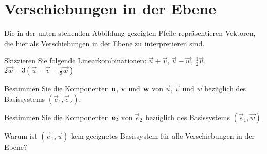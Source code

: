 \documentclass{scrartcl}
\newcommand{\uu}{\vec{u}}
\newcommand{\vv}{\vec{v}}
\newcommand{\ww}{\vec{w}}
\newcommand{\ee}{\vec{e}}
\begin{document}
\section{Verschiebungen in der Ebene }
Die in der unten stehenden Abbildung gezeigten Pfeile repräsentieren Vektoren, die hier als Verschiebungen in der Ebene zu interpretieren sind.
\begin{subex}
  \item{} Skizzieren Sie folgende Linearkombinationen: $\uu + \vv$, $\uu - \ww$, $\frac{1}{2}\uu$, $2\ww + 3(\uu + \vv + \frac{1}{3}\ww)$
  \item{} Bestimmen Sie die Komponenten $\mathbf{u}$, $\mathbf{v}$ und $\mathbf{w}$ von $\uu$, $\vv$ und $\ww$ bezüglich des Basissystems $(\ee_1, \ee_2)$.
  \item{} Bestimmen Sie die Komponenten $\mathbf{e}_2$ von $\ee_2$ bezüglich des Basissystems $(\ee_1, \ww)$.
  \item{} Warum ist $(\ee_1, \uu)$ kein geeignetes Basissystem für alle Verschiebungen in der Ebene?
\end{subex}
\begin{center}
\end{center}
\end{document}
